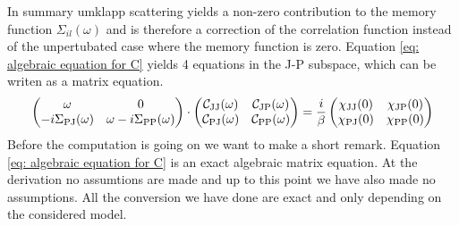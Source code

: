In summary umklapp scattering yields a non-zero contribution to the memory function $\Sigma_{il}(\omega)$ and is therefore a correction of the correlation function instead of the unpertubated case where the memory function is zero.
Equation \eqref{eq: algebraic equation for C} yields 4 equations in the J-P subspace, which can be writen as a matrix equation.
%
\begin{align}
	\begin{pmatrix}
	\omega & 0 \\
	-i\Sigma_{\mathrm{PJ}}(\omega) & \omega - i\Sigma_{\mathrm{PP}}(\omega)
	\end{pmatrix}
	\cdot
	\begin{pmatrix}
	\mathcal{C}_{\mathrm{JJ}}(\omega) &  \mathcal{C}_{\mathrm{JP}}(\omega) \\
	\mathcal{C}_{\mathrm{PJ}}(\omega) &  \mathcal{C}_{\mathrm{PP}}(\omega)
	\end{pmatrix}
	=
	\frac{i}{\beta}
	\begin{pmatrix}
	\chi_{\mathrm{JJ}}(0) &  \chi_{\mathrm{JP}}(0) \\
	\chi_{\mathrm{PJ}}(0) &  \chi_{\mathrm{PP}}(0)
	\end{pmatrix}
	\label{eq: matric equation correlation function unconserved momentum}
\end{align}
%
Before the computation is going on we want to make a short remark.
Equation \eqref{eq: algebraic equation for C} is an exact algebraic matrix equation.
At the derivation no assumtions are made and up to this point we have also made no assumptions.
All the conversion we have done are exact and only depending on the considered model.

